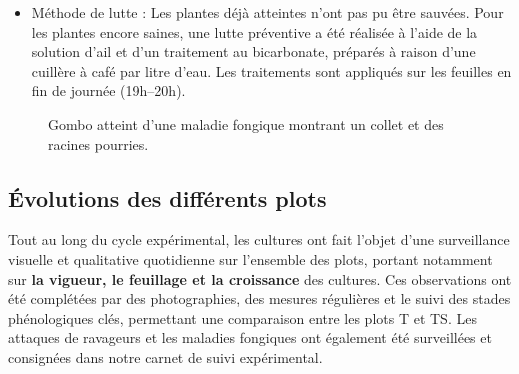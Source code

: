 \begin{itemize}[label=$\bullet$]
\begin{itemize}[label=$\circ$]
    \item Méthode de lutte : Les plantes déjà atteintes n’ont pas pu être sauvées. Pour les plantes encore saines, une lutte préventive a été réalisée à l'aide de la solution d’ail et d’un traitement au bicarbonate, préparés à raison d’une cuillère à café par litre d’eau. Les traitements sont appliqués sur les feuilles en fin de journée (19h--20h).
	\end{itemize}
\end{itemize}

    \begin{figure}[H]
    \centering
    \caption{Gombo atteint d'une maladie fongique montrant un collet et des racines pourries. }
    \label{fig:fongique3}
\end{figure}

\subsection{Évolutions des différents plots}
Tout au long du cycle expérimental, les cultures ont fait l’objet d’une surveillance visuelle et qualitative quotidienne sur l'ensemble des plots, portant notamment sur \textbf{la vigueur, le feuillage et la croissance} des cultures. 
Ces observations ont été complétées par des photographies, des mesures régulières et le suivi des stades phénologiques clés, permettant une comparaison entre les plots T et TS. Les attaques de ravageurs et les maladies fongiques ont également été surveillées et consignées dans notre carnet de suivi expérimental.


















